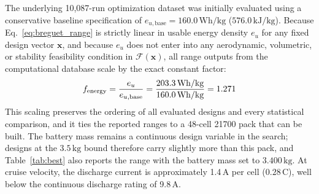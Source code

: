 The underlying 10,087-run optimization dataset was initially evaluated using a conservative baseline specification of $e_{u,\mathrm{base}} = 160.0\,\mathrm{Wh/kg}$ ($576.0\,\mathrm{kJ/kg}$). Because Eq.~\eqref{eq:breguet_range} is strictly linear in usable energy density $e_u$ for any fixed design vector $\mathbf{x}$, and because $e_u$ does not enter into any aerodynamic, volumetric, or stability feasibility condition in $\mathcal{F}(\mathbf{x})$, all range outputs from the computational database scale by the exact constant factor:
\begin{equation}
f_{\mathrm{energy}} = \frac{e_u}{e_{u,\mathrm{base}}} = \frac{203.3\,\mathrm{Wh/kg}}{160.0\,\mathrm{Wh/kg}} = 1.271
\end{equation}
This scaling preserves the ordering of all evaluated designs and every statistical comparison, and it ties the reported ranges to a 48-cell 21700 pack that can be built. The battery mass remains a continuous design variable in the search; designs at the $3.5\,\mathrm{kg}$ bound therefore carry slightly more than this pack, and Table~\ref{tab:best} also reports the range with the battery mass set to $3.400\,\mathrm{kg}$. At cruise velocity, the discharge current is approximately 1.4\,A per cell ($0.28$\,C), well below the continuous discharge rating of 9.8\,A.



